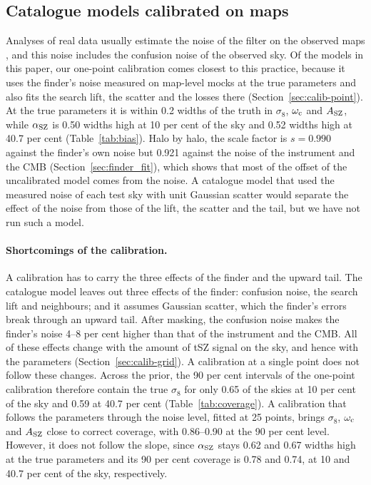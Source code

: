 \subsection{Catalogue models calibrated on maps}\label{sec:discussion:calibrated}

Analyses of real data usually estimate the noise of the filter on the observed maps \citep[e.g.][]{Planck2016XXIV,Bocquet2019,Hilton2021}, and
this noise includes the confusion noise of the observed sky. Of the models in this paper, our one-point
calibration comes closest to this practice, because it uses the finder's noise measured on map-level mocks
at the true parameters and also fits the search lift, the scatter and the losses there
(Section~\ref{sec:calib-point}). At the true parameters it is within 0.2 widths of the truth in $\sigma_8$,
$\omega_\mathrm{c}$ and $A_\mathrm{SZ}$, while $\alpha_\mathrm{SZ}$ is 0.50 widths high at 10 per cent of the sky and 0.52 widths high at 40.7
per cent (Table~\ref{tab:bias}). Halo by halo, the scale factor is $s=0.990$ against the finder's own noise
but 0.921 against the noise of the instrument and the CMB (Section~\ref{sec:finder_fit}), which shows that
most of the offset of the uncalibrated model comes from the noise. A catalogue model that used the measured
noise of each test sky with unit Gaussian scatter would separate the effect of the noise from those of the
lift, the scatter and the tail, but we have not run such a model.

\paragraph*{Shortcomings of the calibration.} A calibration has to carry the three effects of the finder
and the upward tail. The catalogue model leaves out three effects of the finder: confusion noise, the search lift
and neighbours; and it assumes Gaussian scatter, which the finder's errors break through an upward tail.
After masking, the confusion noise makes the finder's noise 4--8 per cent higher than that of the instrument and the CMB. All of these effects change with the amount of tSZ signal on the sky, and hence
with the parameters (Section~\ref{sec:calib-grid}). A calibration at a single point does not follow these
changes. Across the prior, the 90 per cent intervals of the one-point calibration therefore contain the true
$\sigma_8$ for only 0.65 of the skies at 10 per cent of the sky and 0.59 at 40.7 per cent
(Table~\ref{tab:coverage}). A calibration that follows the parameters through the noise level, fitted at
25 points, brings $\sigma_8$, $\omega_\mathrm{c}$ and $A_\mathrm{SZ}$ close to correct coverage, with 0.86--0.90 at the 90 per
cent level. However, it does not follow the slope, since $\alpha_\mathrm{SZ}$ stays 0.62 and 0.67 widths high at the
true parameters and its 90 per cent coverage is 0.78 and 0.74, at 10 and 40.7 per cent of the sky,
respectively.

